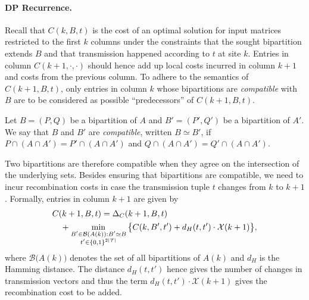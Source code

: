 \paragraph{DP Recurrence.}
Recall that $C(k,B,t)$ is the cost of an optimal solution for input matrices restricted to the first $k$ columns under the constraints that the sought bipartition extends $B$ and that transmission happened according to $t$ at site $k$.
Entries in column $C(k+1,\cdot,\cdot)$ should hence add up local costs incurred in column $k+1$ and costs from the previous column. 
To adhere to the semantics of $C(k+1,B,t)$, only entries in column $k$ whose bipartitions are \emph{compatible} with $B$ are to be considered as possible ``predecessors'' of $C(k+1,B,t)$.
\begin{definition}
Let $B=(P,Q)$ be a bipartition of $A$ and $B'=(P',Q')$ be a bipartition of $A'$.
We say that $B$ and $B'$ are \emph{compatible}, written $B\simeq B'$, if
$P\cap(A\cap A') = P'\cap(A\cap A')$
and
$Q\cap(A\cap A') = Q'\cap(A\cap A')$.
\end{definition}
Two bipartitions are therefore compatible when they agree on the intersection of the underlying sets.
Besides ensuring that bipartitions are compatible, we need to incur recombination costs in case the transmission tuple $t$ changes from $k$ to $k+1$.
Formally, entries in column $k+1$ are given by
\begin{align}\label{eqn:recurrence}
& C(k+1,B,t)= \Delta_C(k+1,B,t)\\
& \quad + \min_{\substack{B'\in\mathcal{B}(A(k)):B'\simeq B\\t'\in\{0,1\}^{2{\left\lvert \mathcal{T} \right\rvert}}}}\big\{C(k,B',t')+d_H(t,t')\cdot\mathcal{X}(k+1)\big\}, \nonumber
\end{align}
where $\mathcal{B}\big(A(k)\big)$ denotes the set of all bipartitions of $A(k)$ and $d_H$ is the Hamming distance.
The distance $d_H(t,t')$ hence gives the number of changes in transmission vectors and thus the term $d_H(t,t')\cdot\mathcal{X}(k+1)$ gives the recombination cost to be added.


